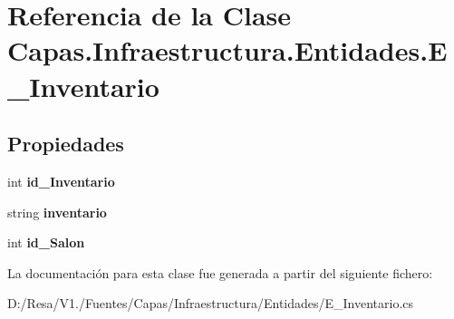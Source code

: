 \section{Referencia de la Clase Capas.\+Infraestructura.\+Entidades.\+E\+\_\+\+Inventario}
\label{class_capas_1_1_infraestructura_1_1_entidades_1_1_e___inventario}
\subsection*{Propiedades}
\begin{DoxyCompactItemize}
\item 
int {\bfseries id\+\_\+\+Inventario}\hspace{0.3cm}{\ttfamily  [get, set]}\label{class_capas_1_1_infraestructura_1_1_entidades_1_1_e___inventario_abd4dfd940582a88c8ff6098ce58e68c6}

\item 
string {\bfseries inventario}\hspace{0.3cm}{\ttfamily  [get, set]}\label{class_capas_1_1_infraestructura_1_1_entidades_1_1_e___inventario_ae1d478f64f44f394d1fd7cdac3dfdcec}

\item 
int {\bfseries id\+\_\+\+Salon}\hspace{0.3cm}{\ttfamily  [get, set]}\label{class_capas_1_1_infraestructura_1_1_entidades_1_1_e___inventario_a455b2d782d5ce3c4c28ba2fd0ae10d8d}

\end{DoxyCompactItemize}


La documentación para esta clase fue generada a partir del siguiente fichero\+:\begin{DoxyCompactItemize}
\item 
D\+:/\+Resa/\+V1./\+Fuentes/\+Capas/\+Infraestructura/\+Entidades/E\+\_\+\+Inventario.\+cs\end{DoxyCompactItemize}
